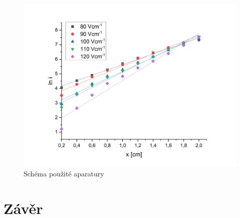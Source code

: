 \documentclass[a4paper,12pt]{article}
\begin{document}
\begin{figure}[h]
	\centering
	\includegraphics[width=130mm]{lni.png}
	\caption{Schéma použité aparatury}
	\label{lni}
\end{figure}


\section{Závěr}
\end{document}
